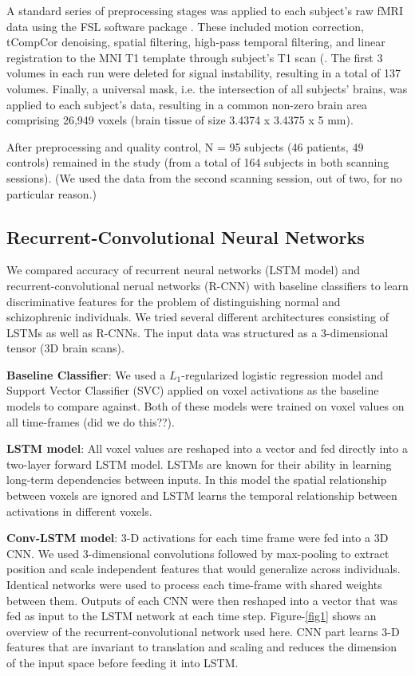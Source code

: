 \documentclass{article}
\begin{document}
A standard series of preprocessing stages was applied to each subject's raw fMRI data using the FSL software package \citep{Jenkinson2012}. These included motion correction, tCompCor denoising, spatial filtering, high-pass temporal filtering, and linear registration to the MNI T1 template through subject's T1 scan (\citep[see][for a more detailed description of the preprocessing stages]{Anonymous2017}. The first 3 volumes in each run were deleted for signal instability, resulting in a total of 137 volumes. Finally, a universal mask, i.e. the intersection of all subjects' brains, was applied to each subject's data, resulting in a common non-zero brain area comprising 26,949 voxels (brain tissue of size 3.4374 x 3.4375 x 5 mm).

After preprocessing and quality control, N = 95 subjects (46 patients, 49 controls) remained in the study (from a total of 164 subjects in both scanning sessions). (We used the data from the second scanning session, out of two, for no particular reason.)

\subsection{Recurrent-Convolutional Neural Networks}

We compared accuracy of recurrent neural networks (LSTM model) and recurrent-convolutional nerual networks (R-CNN) with baseline classifiers to learn discriminative features for the problem of distinguishing normal and schizophrenic individuals. We tried several different architectures consisting of LSTMs as well as R-CNNs. The input data was structured as a 3-dimensional tensor (3D brain scans). 

\textbf{Baseline Classifier}: We used a $L_1$-regularized logistic regression model and Support Vector Classifier (SVC) applied on voxel activations as the baseline models to compare against. Both of these models were trained on voxel values on all time-frames (did we do this??). 

\textbf{LSTM model}: All voxel values are reshaped into a vector and fed directly into a two-layer forward LSTM model. LSTMs are known for their ability in learning long-term dependencies between inputs. In this model the spatial relationship between voxels are ignored and LSTM learns the temporal relationship between activations in different voxels. 

\textbf{Conv-LSTM model}: 3-D activations for each time frame were fed into a 3D CNN. We used 3-dimensional convolutions followed by max-pooling to extract position and scale independent features that would generalize across individuals. Identical networks were used to process each time-frame with shared weights between them. Outputs of each CNN were then reshaped into a vector that was fed as input to the LSTM network at each time step. Figure-\ref{fig1} shows an overview of the recurrent-convolutional network used here. CNN part learns 3-D features that are invariant to translation and scaling and reduces the dimension of the input space before feeding it into LSTM. 
\end{document}
